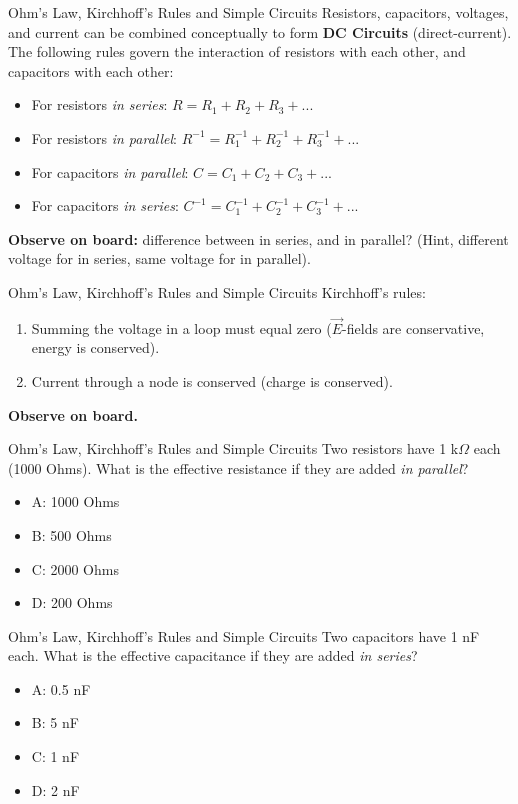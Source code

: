\documentclass{beamer}
\begin{document}
\begin{frame}{Ohm's Law, Kirchhoff's Rules and Simple Circuits}
Resistors, capacitors, voltages, and current can be combined conceptually to form \alert{\textbf{DC Circuits}} (direct-current).  The following rules govern the interaction of resistors with each other, and capacitors with each other:
\begin{itemize}
\item For resistors \textit{in series}: $R = R_1 + R_2 + R_3 + ...$
\item For resistors \textit{in parallel}: $R^{-1} = R_1^{-1} + R_2^{-1} + R_3^{-1} + ...$
\item For capacitors \textit{in parallel}: $C = C_1 + C_2 + C_3 + ...$
\item For capacitors \textit{in series}: $C^{-1} = C_1^{-1} + C_2^{-1} + C_3^{-1} + ...$
\end{itemize}
\textbf{Observe on board:} difference between in series, and in parallel? (Hint, different voltage for in series, same voltage for in parallel).
\end{frame}

\begin{frame}{Ohm's Law, Kirchhoff's Rules and Simple Circuits}
Kirchhoff's rules:
\begin{enumerate}
\item Summing the voltage in a loop must equal zero ($\vec{E}$-fields are conservative, energy is conserved).
\item Current through a node is conserved (charge is conserved).
\end{enumerate}
\textbf{Observe on board.}
\end{frame}

\begin{frame}{Ohm's Law, Kirchhoff's Rules and Simple Circuits}
Two resistors have 1 k$\Omega$ each (1000 Ohms).  What is the effective resistance if they are added \textit{in parallel}?
\begin{itemize}
\item A: 1000 Ohms
\item B: 500 Ohms
\item C: 2000 Ohms
\item D: 200 Ohms
\end{itemize}
\end{frame}

\begin{frame}{Ohm's Law, Kirchhoff's Rules and Simple Circuits}
Two capacitors have 1 nF each.  What is the effective capacitance if they are added \textit{in series}?
\begin{itemize}
\item A: 0.5 nF
\item B: 5 nF
\item C: 1 nF
\item D: 2 nF
\end{itemize}
\end{frame}
\end{document}
